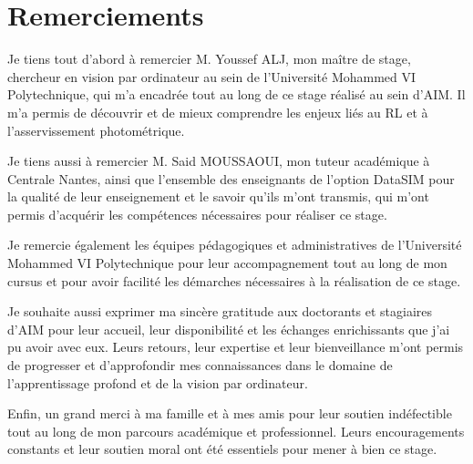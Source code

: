 \newpage
\section*{Remerciements}


Je tiens tout d'abord à remercier M. Youssef ALJ, mon maître de stage, chercheur en vision par ordinateur au sein de l'Université Mohammed VI Polytechnique, qui m'a encadrée tout au long de ce stage réalisé au sein d'AIM. Il m'a permis de découvrir et de mieux comprendre les enjeux liés au RL et à l'asservissement photométrique.

Je tiens aussi à remercier M. Said MOUSSAOUI, mon tuteur académique à Centrale Nantes, ainsi que  l'ensemble des enseignants de l'option DataSIM pour la qualité de leur enseignement et le savoir qu'ils m'ont transmis, qui m'ont permis d'acquérir les compétences nécessaires pour réaliser ce stage.

Je remercie également les équipes pédagogiques et administratives de l'Université Mohammed VI Polytechnique pour leur accompagnement tout au long de mon cursus et pour avoir facilité les démarches nécessaires à la réalisation de ce stage.

Je souhaite aussi exprimer ma sincère gratitude aux doctorants et stagiaires d'AIM pour leur accueil, leur disponibilité et les échanges enrichissants que j'ai pu avoir avec eux. Leurs retours, leur expertise et leur bienveillance m'ont permis de progresser et d'approfondir mes connaissances dans le domaine de l'apprentissage profond et de la vision par ordinateur.

Enfin, un grand merci à ma famille et à mes amis pour leur soutien indéfectible tout au long de mon parcours académique et professionnel. Leurs encouragements constants et leur soutien moral ont été essentiels pour mener à bien ce stage.

